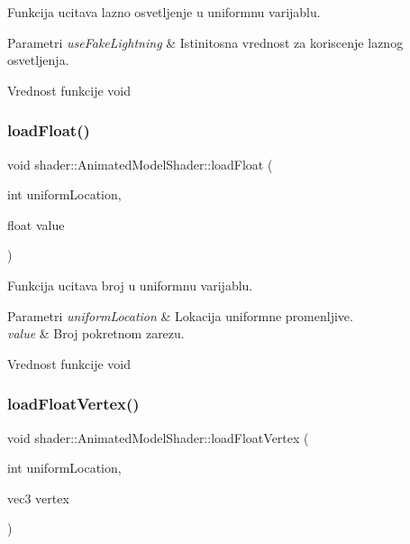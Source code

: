 Funkcija ucitava lazno osvetljenje u uniformnu varijablu. 


\begin{DoxyParams}{Parametri}
{\em use\+Fake\+Lightning} & Istinitosna vrednost za koriscenje laznog osvetljenja. \\
\hline
\end{DoxyParams}
\begin{DoxyReturn}{Vrednost funkcije}
void 
\end{DoxyReturn}
\mbox{\label{classshader_1_1AnimatedModelShader_aee125607dd4ec4add27abc2f73864c03}} 
\subsubsection{\texorpdfstring{load\+Float()}{loadFloat()}}
{\footnotesize\ttfamily void shader\+::\+Animated\+Model\+Shader\+::load\+Float (\begin{DoxyParamCaption}\item[{int}]{uniform\+Location,  }\item[{float}]{value }\end{DoxyParamCaption})}



Funkcija ucitava broj u uniformnu varijablu. 


\begin{DoxyParams}{Parametri}
{\em uniform\+Location} & Lokacija uniformne promenljive. \\
\hline
{\em value} & Broj pokretnom zarezu. \\
\hline
\end{DoxyParams}
\begin{DoxyReturn}{Vrednost funkcije}
void 
\end{DoxyReturn}
\mbox{\label{classshader_1_1AnimatedModelShader_ab96bff27275920f8f57f27212803032d}} 
\subsubsection{\texorpdfstring{load\+Float\+Vertex()}{loadFloatVertex()}}
{\footnotesize\ttfamily void shader\+::\+Animated\+Model\+Shader\+::load\+Float\+Vertex (\begin{DoxyParamCaption}\item[{int}]{uniform\+Location,  }\item[{vec3}]{vertex }\end{DoxyParamCaption})}



